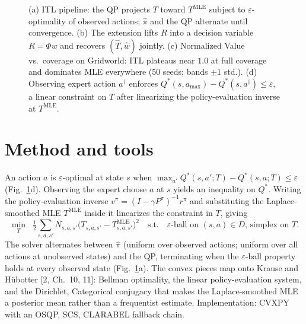 \documentclass[11pt]{article}
\begin{document}
\begin{figure}[!htbp]
\begin{minipage}[c]{0.42\textwidth}
\end{minipage}
\caption{(a) ITL pipeline: the QP projects $T$ toward $T^{\mathrm{MLE}}$ subject to $\varepsilon$-optimality of observed actions; $\hat\pi$ and the QP alternate until convergence. (b) The extension lifts $R$ into a decision variable $R = \Phi w$ and recovers $(\hat T, \hat w)$ jointly. (c) Normalized Value vs.\ coverage on Gridworld: ITL plateaus near $1.0$ at full coverage and dominates MLE everywhere (50 seeds; bands $\pm 1$ std.). (d) Observing expert action $a^{\dagger}$ enforces $Q^{*}(s,a_{\max}){-}Q^{*}(s,a^{\dagger}){\le}\varepsilon$, a linear constraint on $T$ after linearizing the policy-evaluation inverse at $T^{\mathrm{MLE}}$.}
\label{fig:mech}
\end{figure}

\section{Method and tools}

An action $a$ is $\varepsilon$-optimal at state $s$ when $\max_{a'} Q^{*}(s, a'; T) {-} Q^{*}(s, a; T) {\le} \varepsilon$ (Fig.~\ref{fig:mech}d). Observing the expert choose $a$ at $s$ yields an inequality on $Q^{*}$. Writing the policy-evaluation inverse $v^{\pi} = (I {-} \gamma P^{\pi})^{-1} r^{\pi}$ and substituting the Laplace-smoothed MLE $T^{\mathrm{MLE}}$ inside it linearizes the constraint in $T$, giving
\begin{equation*}
\min_{T} \;\; \tfrac{1}{2}\sum_{s,a,s'} N_{s,a,s'} \bigl(T_{s,a,s'} {-} T^{\mathrm{MLE}}_{s,a,s'}\bigr)^{2}
\quad \text{s.t.} \quad
\text{$\varepsilon$-ball on $(s,a) \in D$, simplex on $T$.}
\end{equation*}
The solver alternates between $\hat\pi$ (uniform over observed actions; uniform over all actions at unobserved states) and the QP, terminating when the $\varepsilon$-ball property holds at every observed state (Fig.~\ref{fig:mech}a). The convex pieces map onto Krause and H\"ubotter [2, Ch.\ 10, 11]: Bellman optimality, the linear policy-evaluation system, and the Dirichlet, Categorical conjugacy that makes the Laplace-smoothed MLE a posterior mean rather than a frequentist estimate. Implementation: CVXPY with an OSQP, SCS, CLARABEL fallback chain.
\end{document}

